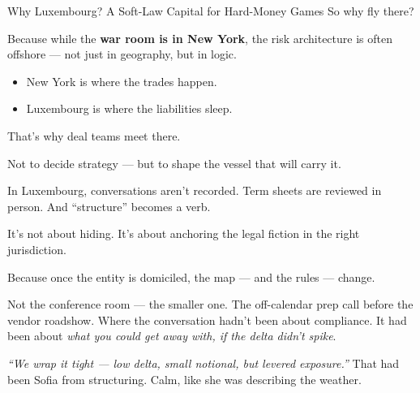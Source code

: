 \begin{HistoricalSidebar}{Why Luxembourg? A Soft-Law Capital for Hard-Money Games}
    So why fly there?

    \medskip
    
    Because while the \textbf{war room is in New York}, the risk architecture is often offshore — not just in geography, but in logic.
    
    \medskip
    
    \begin{itemize}
    \item New York is where the trades happen.
    \item Luxembourg is where the liabilities sleep.
    \end{itemize}
    
    That’s why deal teams meet there.

    \medskip
    
    Not to decide strategy — but to shape the vessel that will carry it.

    \medskip
    
    In Luxembourg, conversations aren’t recorded. Term sheets are reviewed in person. And “structure” becomes a verb.
    
    \medskip
    
    It’s not about hiding. It’s about anchoring the legal fiction in the right jurisdiction.

    \medskip
    
    Because once the entity is domiciled, the map — and the rules — change.
    
\end{HistoricalSidebar}

\medskip

Not the conference room — the smaller one. The off-calendar prep call before the vendor roadshow.
Where the conversation hadn’t been about compliance. It had been about \textit{what you could get 
away with, if the delta didn’t spike}.

\textit{“We wrap it tight — low delta, small notional, but levered exposure.”}
That had been Sofia from structuring. Calm, like she was describing the weather.

